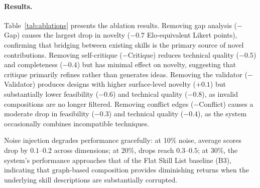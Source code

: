 \paragraph{Results.}
Table~\ref{tab:ablations} presents the ablation results. Removing gap analysis ($-$Gap) causes the largest drop in novelty ($-0.7$ Elo-equivalent Likert points), confirming that bridging between existing skills is the primary source of novel contributions. Removing self-critique ($-$Critique) reduces technical quality ($-0.5$) and completeness ($-0.4$) but has minimal effect on novelty, suggesting that critique primarily refines rather than generates ideas. Removing the validator ($-$Validator) produces designs with higher surface-level novelty ($+0.1$) but substantially lower feasibility ($-0.6$) and technical quality ($-0.8$), as invalid compositions are no longer filtered. Removing conflict edges ($-$Conflict) causes a moderate drop in feasibility ($-0.3$) and technical quality ($-0.4$), as the system occasionally combines incompatible techniques.

Noise injection degrades performance gracefully: at 10\% noise, average scores drop by $0.1$--$0.2$ across dimensions; at 20\%, drops reach $0.3$--$0.5$; at 30\%, the system's performance approaches that of the Flat Skill List baseline (B3), indicating that graph-based composition provides diminishing returns when the underlying skill descriptions are substantially corrupted.

